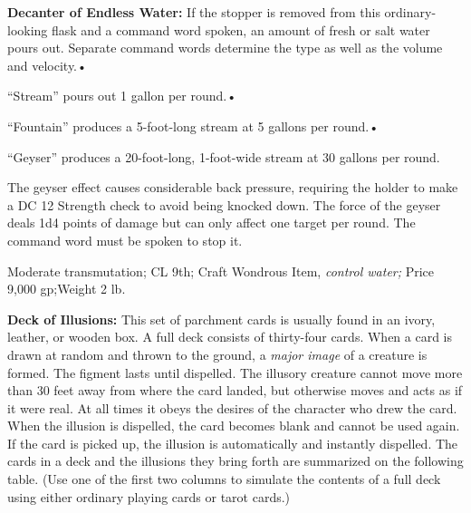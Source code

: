 \textbf{Decanter of Endless Water:} If the stopper is removed from this ordinary-looking 
flask and a command word spoken, an amount of fresh or salt water pours out. Separate 
command words determine the type as well as the volume and velocity.•

``Stream'' pours out 1 gallon per round.•

``Fountain'' produces a 5-foot-long stream at 5 gallons per round.•

``Geyser'' produces a 20-foot-long, 1-foot-wide stream at 30 gallons per round.

The geyser effect causes considerable back pressure, requiring the holder to make 
a DC 12 Strength check to avoid being knocked down. The force of the geyser deals 
1d4 points of damage but can only affect one target per round. The command word 
must be spoken to stop it.

Moderate transmutation; CL 9th; Craft Wondrous Item, \textit{control water; }Price 
9,000 gp;Weight 2 lb.

\textbf{Deck of Illusions:} This set of parchment cards is usually found in an 
ivory, leather, or wooden box. A full deck consists of thirty-four cards. When 
a card is drawn at random and thrown to the ground, a \textit{major image }of a 
creature is formed. The figment lasts until dispelled. The illusory creature cannot 
move more than 30 feet away from where the card landed, but otherwise moves and 
acts as if it were real. At all times it obeys the desires of the character who 
drew the card. When the illusion is dispelled, the card becomes blank and cannot 
be used again. If the card is picked up, the illusion is automatically and instantly 
dispelled. The cards in a deck and the illusions they bring forth are summarized 
on the following table. (Use one of the first two columns to simulate the contents 
of a full deck using either ordinary playing cards or tarot cards.)

